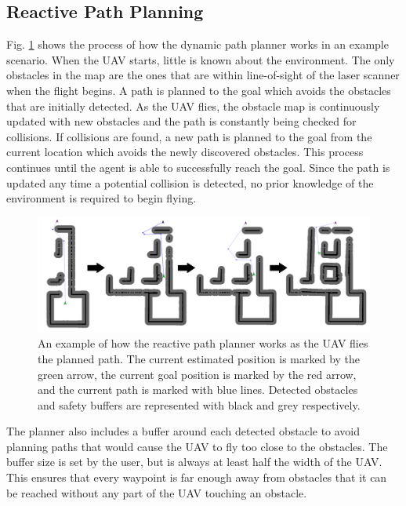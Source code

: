 \documentclass[letterpaper, 10 pt, conference]{ieeeconf}  %
\begin{document}
\subsection{Reactive Path Planning}

Fig. \ref{fig:reactive_plan} shows the process of how the dynamic path planner works in an example scenario. When the UAV starts, little is known about the environment. The only obstacles in the map are the ones that are within line-of-sight of the laser scanner when the flight begins. A path is planned to the goal which avoids the obstacles that are initially detected. As the UAV flies, the obstacle map is continuously updated with new obstacles and the path is constantly being checked for collisions. If collisions are found, a new path is planned to the goal from the current location which avoids the newly discovered obstacles. This process continues until the agent is able to successfully reach the goal. Since the path is updated any time a potential collision is detected, no prior knowledge of the environment is required to begin flying.

\begin{figure}
\centering
\includegraphics[width=1.0\linewidth]{adaptive_path_plan2.png}
\caption{An example of how the reactive path planner works as the UAV flies the planned path. The current estimated position is marked by the green arrow, the current goal position is marked by the red arrow, and the current path is marked with blue lines. Detected obstacles and safety buffers are represented with black and grey respectively.}
\label{fig:reactive_plan}
\end{figure}

The planner also includes a buffer around each detected obstacle to avoid planning paths that would cause the UAV to fly too close to the obstacles. The buffer size is set by the user, but is always at least half the width of the UAV. This ensures that every waypoint is far enough away from obstacles that it can be reached without any part of the UAV touching an obstacle.
\end{document}
